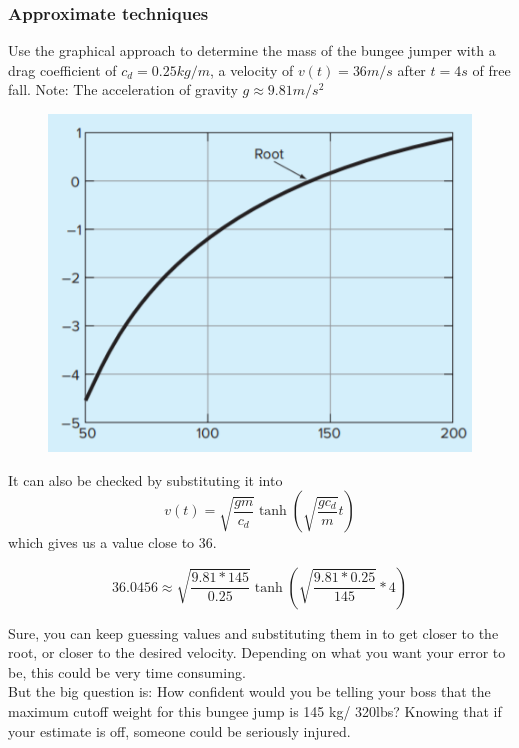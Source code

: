 \documentclass{if-beamer}
\begin{document}
\begin{frame}
\frametitle{Approximate techniques}
Use the graphical approach to determine the mass of the bungee jumper with a drag coefficient of $c_d = 0.25 kg/m$, a velocity of $v(t)=36 m/s$ after $t = 4 s$ of free fall. Note: The acceleration of gravity $g \approx 9.81 m/s^2$ \\
\vspace{5pt}
\begin{minipage}{0.5\textwidth}
	\begin{figure}
		\centering
		\includegraphics[width = \textwidth]{figures/BunjeeJumpGraph}
	\end{figure}
\end{minipage}
\begin{minipage}{0.5\textwidth}
	It can also be checked by substituting it into
	$$v(t) = \sqrt{\frac{gm}{c_d}}\tanh\left(\sqrt{\frac{gc_d}{m}}t\right)$$
	which gives us a value close to 36.
\end{minipage}
$$36.0456\approx \sqrt{\frac{9.81*145}{0.25}}\tanh\left(\sqrt{\frac{9.81*0.25}{145}}*4\right) $$
\end{frame}

\begin{frame}
Sure, you can keep guessing values and substituting them in to get closer to the root, or closer to the desired velocity. Depending on what you want your error to be, this could be very time consuming. \\
\vspace{10pt}
But the big question is: How confident would you be telling your boss that the maximum cutoff weight for this bungee jump is 145 kg/ 320lbs? Knowing that if your estimate is off, someone could be seriously injured.
\end{frame}
\end{document}
